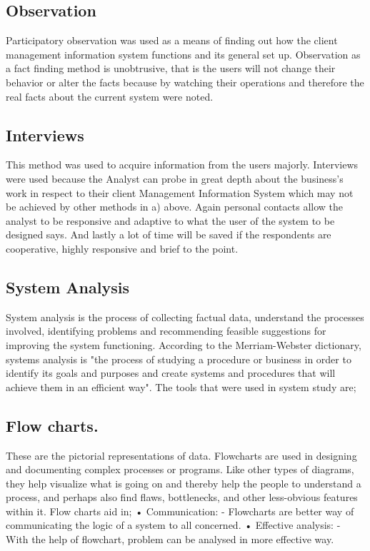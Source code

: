 \documentclass[11pt]{article}
\begin{document}
\subsection*{Observation} 
Participatory observation was used as a means of finding out how the client management information system functions and its general set up. Observation as a fact finding method is unobtrusive, that is the users will not change their behavior or alter the facts because by watching their operations and therefore the real facts about the current system were noted.

\subsection*{Interviews}
This method was used to acquire information from the users majorly. Interviews were used because the Analyst can probe in great depth about the business’s work in respect to their client Management Information System which may not be achieved by other methods in a) above. Again personal contacts allow the analyst to be responsive and adaptive to what the user of the system to be designed says. And lastly a lot of time will be saved if the respondents are cooperative, highly responsive and brief to the point.


\subsection*{System Analysis}
System analysis is the process of collecting factual data, understand the processes involved, identifying problems and recommending feasible suggestions for improving the system functioning.
According to the Merriam-Webster dictionary, systems analysis is "the process of studying a procedure or business in order to identify its goals and purposes and create systems and procedures that will achieve them in an efficient way".
The tools that were used in system study are;

\subsection*{Flow charts.}
These are the pictorial representations of data. Flowcharts are used in designing and documenting complex processes or programs. Like other types of diagrams, they help visualize what is going on and thereby help the people to understand a process, and perhaps also find flaws, bottlenecks, and other less-obvious features within it.
Flow charts aid in;
•	Communication: - Flowcharts are better way of communicating the logic of a system to all concerned. 
•	Effective analysis: - With the help of flowchart, problem can be analysed in more effective way. 
\end{document}
